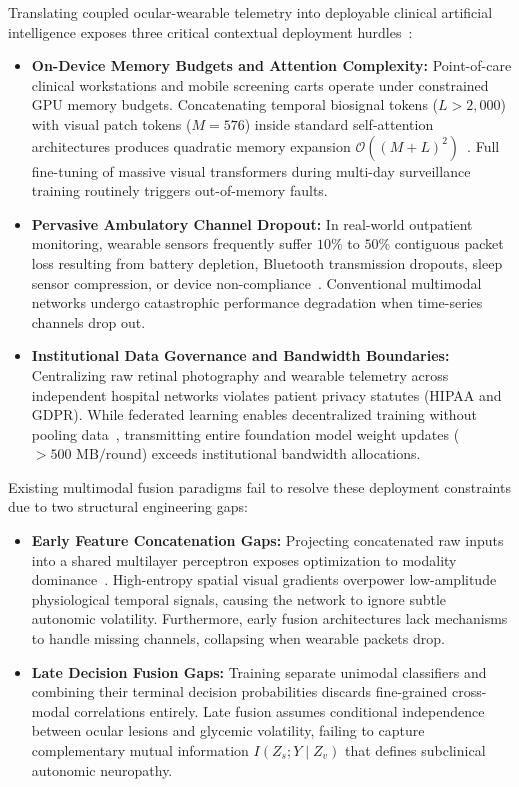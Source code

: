 \documentclass[journal,10pt,twocolumn]{IEEEtran}
\begin{document}
Translating coupled ocular-wearable telemetry into deployable clinical artificial intelligence exposes three critical contextual deployment hurdles~\cite{baltrusaitis2018multimodal,ma2023multimodal}:
\begin{itemize}
    \item \textbf{On-Device Memory Budgets and Attention Complexity:} Point-of-care clinical workstations and mobile screening carts operate under constrained GPU memory budgets. Concatenating temporal biosignal tokens ($L > 2{,}000$) with visual patch tokens ($M=576$) inside standard self-attention architectures produces quadratic memory expansion $\mathcal{O}((M + L)^2)$~\cite{vaswani2017attention}. Full fine-tuning of massive visual transformers during multi-day surveillance training routinely triggers out-of-memory faults.
    \item \textbf{Pervasive Ambulatory Channel Dropout:} In real-world outpatient monitoring, wearable sensors frequently suffer $10\%$ to $50\%$ contiguous packet loss resulting from battery depletion, Bluetooth transmission dropouts, sleep sensor compression, or device non-compliance~\cite{ma2023multimodal}. Conventional multimodal networks undergo catastrophic performance degradation when time-series channels drop out.
    \item \textbf{Institutional Data Governance and Bandwidth Boundaries:} Centralizing raw retinal photography and wearable telemetry across independent hospital networks violates patient privacy statutes (HIPAA and GDPR). While federated learning enables decentralized training without pooling data~\cite{mcmahan2017communication,rieke2020future,sajjadi2024speed}, transmitting entire foundation model weight updates ($>500\text{ MB/round}$) exceeds institutional bandwidth allocations.
\end{itemize}

Existing multimodal fusion paradigms fail to resolve these deployment constraints due to two structural engineering gaps:
\begin{itemize}
    \item \textbf{Early Feature Concatenation Gaps:} Projecting concatenated raw inputs into a shared multilayer perceptron exposes optimization to modality dominance~\cite{nagrani2021attention,ma2023multimodal}. High-entropy spatial visual gradients overpower low-amplitude physiological temporal signals, causing the network to ignore subtle autonomic volatility. Furthermore, early fusion architectures lack mechanisms to handle missing channels, collapsing when wearable packets drop.
    \item \textbf{Late Decision Fusion Gaps:} Training separate unimodal classifiers and combining their terminal decision probabilities discards fine-grained cross-modal correlations entirely. Late fusion assumes conditional independence between ocular lesions and glycemic volatility, failing to capture complementary mutual information $I(Z_s; Y \mid Z_v)$ that defines subclinical autonomic neuropathy.
\end{itemize}
\end{document}
